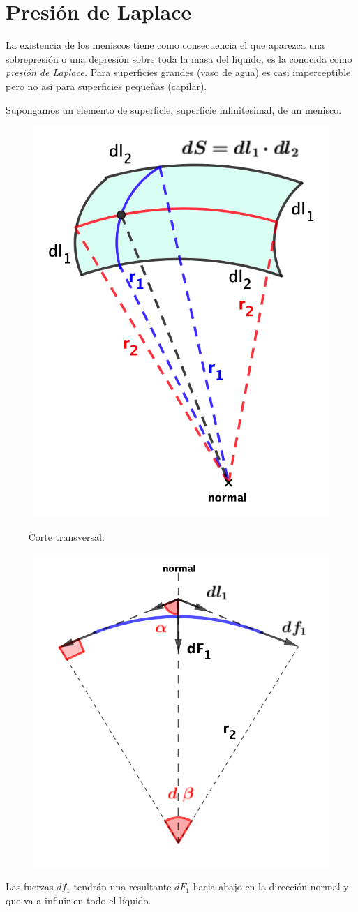 \section{Presión de Laplace}

La existencia de los meniscos tiene como consecuencia el que aparezca una sobrepresión o una depresión sobre toda la masa del líquido, es la conocida como \emph{presión de Laplace.} Para superficies grandes (vaso de agua) es casi imperceptible pero no así para superficies pequeñas (capilar).

Supongamos un elemento de superficie, superficie infinitesimal, de un menisco.

\begin{multicols}{2}
\begin{figure}[H]
	\centering
	\includegraphics[width=.45\textwidth]{imagenes/imagenes08/T08IM06.png}
\end{figure}
$\quad \quad$ Corte transversal:

\begin{figure}[H]
	\centering
	\includegraphics[width=.5\textwidth]{imagenes/imagenes08/T08IM07.png}
\end{figure}
\end{multicols}
Las fuerzas $df_1$ tendrán una resultante $dF_1$ hacia abajo en la dirección normal y que va a influir en todo el líquido.

